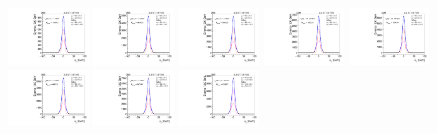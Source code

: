 \begin{figure}[htb]
\ContinuedFloat
\centering
\includegraphics[width=0.19\textwidth]{plots/Appendix_Recoil_Fits/WmpMC_PF_13TeV_2G/pfu2fit_0.pdf}
\includegraphics[width=0.19\textwidth]{plots/Appendix_Recoil_Fits/WmpMC_PF_13TeV_2G/pfu2fit_1.pdf}
\includegraphics[width=0.19\textwidth]{plots/Appendix_Recoil_Fits/WmpMC_PF_13TeV_2G/pfu2fit_2.pdf}
\includegraphics[width=0.19\textwidth]{plots/Appendix_Recoil_Fits/WmpMC_PF_13TeV_2G/pfu2fit_3.pdf}
\includegraphics[width=0.19\textwidth]{plots/Appendix_Recoil_Fits/WmpMC_PF_13TeV_2G/pfu2fit_4.pdf}
\includegraphics[width=0.19\textwidth]{plots/Appendix_Recoil_Fits/WmpMC_PF_13TeV_2G/pfu2fit_5.pdf}
\includegraphics[width=0.19\textwidth]{plots/Appendix_Recoil_Fits/WmpMC_PF_13TeV_2G/pfu2fit_6.pdf}
\includegraphics[width=0.19\textwidth]{plots/Appendix_Recoil_Fits/WmpMC_PF_13TeV_2G/pfu2fit_7.pdf}

\end{figure}
